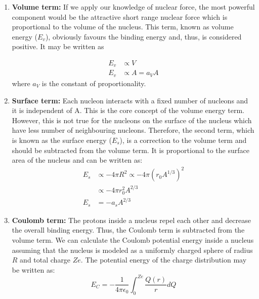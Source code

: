 \documentclass[ebook,12pt,oneside,openany]{memoir}
\begin{document}
    
    \begin{enumerate}[label=\textbf{\Alph*.}]
    
        \item \textbf{Volume term:}     If we apply our knowledge of nuclear force, the most powerful component would be the attractive short range nuclear force which is proportional to the volume of the nucleus. This term, known as volume energy ($E_v$), obviously favours the binding energy and, thus, is considered positive. It may be written as
        
            \begin{equation}
                \begin{split}
                    E_v &\propto V\\
                    E_v &\propto A = a_VA
                \end{split}    
            \end{equation}
            \hspace{5em} where $a_V$ is the constant of proportionality.
    
        \item \textbf{Surface term:}    Each nucleon interacts with a fixed number of nucleons and it is independent of A. This is the core concept of the volume energy term. However, this is not true for the nucleons on the surface of the nucleus which have less number of neighbouring nucleons. Therefore, the second term, which is known as the surface energy ($E_s$), is a correction to the volume term and should be subtracted from the volume term. It is proportional to the surface area of the nucleus and can be written as:
            \begin{equation}
                \begin{split}
                    E_s &\propto -4\pi R^2 \propto -4 \pi (r_0A^{1/3})^2\\&\propto -4 \pi r_0^2 A^{2/3}\\
                    E_s &= -a_sA^{2/3}
                \end{split}
            \end{equation}
        
        \item \textbf{Coulomb term:}    The protons inside a nucleus repel each other and decrease the overall binding energy. Thus, the Coulomb term is subtracted from the volume term. We can calculate the Coulomb potential energy inside a nucleus assuming that the nucleus is modeled as a uniformly charged sphere of radius $R$ and total charge $Ze$.  The potential energy of the charge distribution may be written as:
            \begin{equation}
                E_C = -\frac{1}{4 \pi \epsilon_0}  \int_0^{Ze} \frac{Q(r)}{r}dQ
            \end{equation}
        

\end{enumerate}
\end{document}
